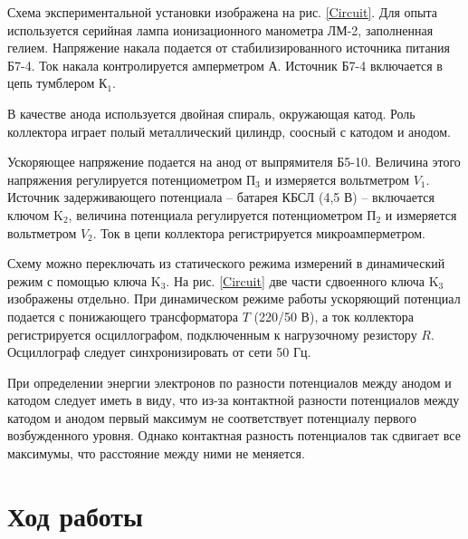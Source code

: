 \documentclass[12pt,a4paper]{article}
\begin{document}
	Схема экспериментальной установки изображена на рис. \ref{Circuit}. Для опыта используется серийная лампа ионизационного манометра ЛМ-2, заполненная гелием. Напряжение накала подается от стабилизированного источника питания Б7-4. Ток накала контролируется амперметром А. Источник Б7-4 включается в цепь тумблером К$_1$.
	
	В качестве анода используется двойная спираль, окружающая катод. Роль коллектора играет полый металлический цилиндр, соосный с катодом и анодом.
	
	Ускоряющее напряжение подается на анод от выпрямителя Б5-10. Величина этого напряжения регулируется потенциометром П$_3$ и измеряется вольтметром $V_1$. Источник задерживающего потенциала -- батарея КБСЛ (4,5 В) -- включается ключом K$_2$, величина потенциала регулируется потенциометром П$_2$ и измеряется вольтметром $V_2$. Ток в цепи коллектора регистрируется микроамперметром.

	Схему можно переключать из статического режима измерений в динамический режим с помощью ключа K$_3$. На рис. \ref{Circuit} две части сдвоенного ключа K$_3$ изображены отдельно. При динамическом режиме работы ускоряющий потенциал подается с понижающего трансформатора $T$ (220/50 В), а ток коллектора регистрируется осциллографом, подключенным к нагрузочному резистору $R$. Осциллограф следует синхронизировать от сети 50 Гц.

	При определении энергии электронов по разности потенциалов между анодом и катодом следует иметь в виду, что из-за контактной разности потенциалов между катодом и анодом первый максимум не соответствует потенциалу первого возбужденного уровня. Однако контактная разность потенциалов так сдвигает все максимумы, что расстояние между ними не меняется.
 
    \section*{Ход работы}
	
\end{document}
